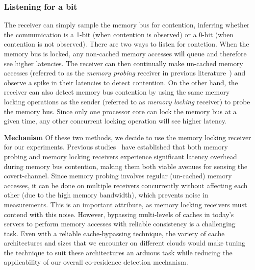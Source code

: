 \subsubsection{Listening for a bit}
The receiver can simply sample the memory bus for contention, inferring whether 
the communication is a 1-bit (when contention is observed) or a 0-bit 
(when contention is not observed). There are two ways to listen for contetion. 
When the memory bus is locked, any
non-cached memory accesses will queue and therefore see higher latencies.  The
receiver can then continually make un-cached memory accesses (referred to as the
\textit{memory probing} receiver in previous literature~\cite{varadarajan2015})
and observe a spike in their latencies to detect contention. On the other hand,
the receiver can also detect memory bus contention by using the same memory
locking operations as the sender (referred to as \textit{memory locking}
receiver) to probe the memory bus. Since only one processor core can lock the
memory bus at a given time, any other concurrent locking operation will see
higher latency. 

\textbf{Mechanism} Of these two methods, we decide to use the memory locking receiver for our
experiments.  Previous studies~\cite{wuusenix2012,varadarajan2015} have
established that both memory probing and memory locking receivers experience
significant latency overhead during memory bus contention, making them both
viable avenues for sensing the covert-channel. 
Since memory probing involves regular (un-cached) memory accesses, it can be done
on multiple receivers concurrently without affecting each other (due to the high
memory bandwidth), which prevents noise in measurements. This is an important
attribute, as memory locking receivers must contend with this noise. However,
bypassing multi-levels of caches in today's servers to perform memory accesses
with reliable consistency is a challenging task. Even with a reliable
cache-bypassing technique, the variety of cache architectures and sizes that we
encounter on different clouds would make tuning the technique to suit these
architectures an arduous task while reducing the applicability of our overall
co-residence detection mechanism. 


